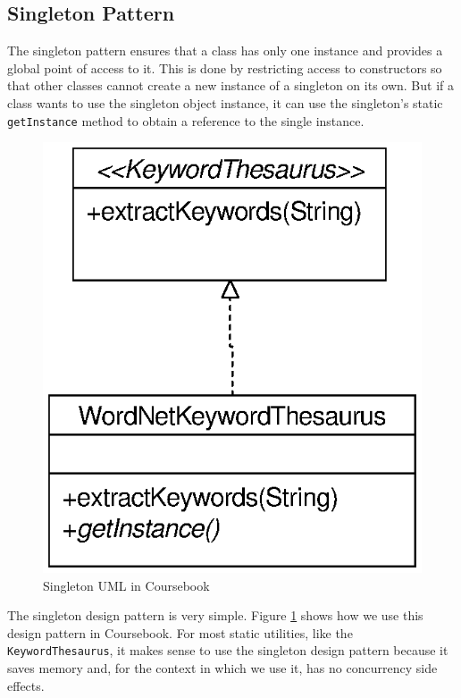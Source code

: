 \subsection{Singleton Pattern}

The singleton pattern \cite{GangOf4} ensures that a class has only one instance
and provides a global point of access to it. This is done by restricting access
to constructors so that other classes cannot create a new instance of a
singleton on its own. But if a class wants to use the singleton object instance,
it can use the singleton's static \verb!getInstance! method to obtain a
reference to the single instance.

\begin{figure}[t]
  \begin{center}
  \includegraphics[scale=1.00]{images/singletonUML}
  \caption{Singleton UML in Coursebook}
  \label{fig:singletonUML}
  \end{center}
\end{figure}

The singleton design pattern is very simple. Figure \ref{fig:singletonUML} shows
how we use this design pattern in Coursebook. For most static utilities, like
the \verb!KeywordThesaurus!, it makes sense to use the singleton design pattern
because it saves memory and, for the context in which we use it, has no
concurrency side effects.

